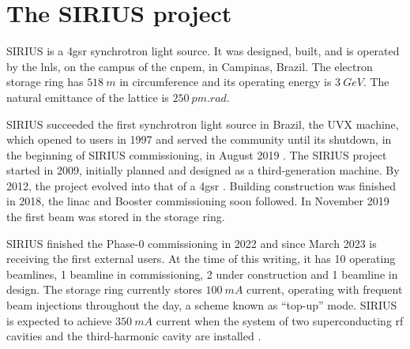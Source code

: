 \section*{The SIRIUS project}

SIRIUS is a \gls*{4gsr} synchrotron light source. It was designed, built, and is operated by the \gls*{lnls}, on the campus of the \gls*{cnpem}, in Campinas, Brazil. The electron storage ring has $518~\unit{m}$ in circumference and its operating energy is $3~\unit{GeV}$. The natural emittance of the lattice is $250~\unit{pm}.\unit{rad}$.

SIRIUS succeeded the first synchrotron light source in Brazil, the UVX machine, which opened to users in 1997 and served the community until its shutdown, in the beginning of SIRIUS commissioning, in August 2019
\cite{liu_synchrotron_2019}. The SIRIUS project started in 2009, initially planned and designed as a third-generation machine. By 2012, the project evolved into that of a \gls*{4gsr} \cite{liu_synchrotron_2019}. Building construction was finished in 2018, the \acrshort*{linac} and Booster commissioning soon followed. In November 2019 the first beam was stored in the storage ring.

SIRIUS finished the Phase-0 commissioning in 2022 and since March 2023 is receiving the first external users. At the time of this writing,  it has 10 operating beamlines, 1 beamline in commissioning, 2 under construction and 1 beamline in design\cite{lnls_beamlines}. The storage ring currently stores $100~\unit{mA}$ current, operating with frequent beam injections throughout the day, a scheme known as ``top-up'' mode. SIRIUS is expected to achieve $350~\unit{mA}$ current when the system of two superconducting \gls*{rf} cavities and the third-harmonic cavity are installed \cite{liu_status_2022,liu_status_2023}.

